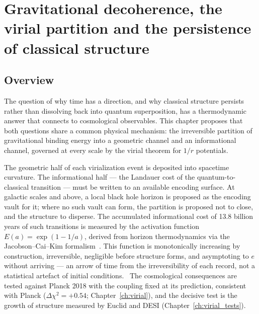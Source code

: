 
\chapter{Gravitational decoherence, the virial partition and the persistence of classical structure}\label{ch:virial_decoherence}

\section*{Overview}
The question of why time has a direction, and why classical structure persists rather than dissolving back into quantum superposition, has a thermodynamic
answer that connects to cosmological observables. This chapter proposes that both questions share a common physical mechanism: the irreversible partition of
gravitational binding energy into a geometric channel and an informational channel, governed at every scale by the virial theorem for $1/r$ potentials.
\conjecture

The geometric half of each virialization event is deposited into spacetime curvature. The informational half --- the Landauer cost of the
quantum-to-classical transition --- must be written to an available encoding surface. At galactic scales and above, a local black hole horizon is proposed
as the encoding vault for it; where no such vault can form, the partition is proposed not to close, and the structure to disperse. The accumulated
informational cost of 13.8 billion years of such transitions is measured by the activation function $E(a)=\exp(1-1/a)$, derived from horizon
thermodynamics via the Jacobson--Cai--Kim formalism~\cite{Jacobson1995,CaiKim2005}. This function is monotonically increasing by construction, irreversible,
negligible before structure forms, and asymptoting to $e$ without arriving --- an arrow of time from the irreversibility of each record, not a statistical
artefact of initial conditions. \interp\ The cosmological consequences are tested against Planck 2018 with the coupling fixed at its prediction, consistent
with Planck ($\Delta\chi^2=+0.54$; Chapter~\ref{ch:virial}), and the decisive test is the growth of structure measured by Euclid and DESI
(Chapter~\ref{ch:virial_tests}).

